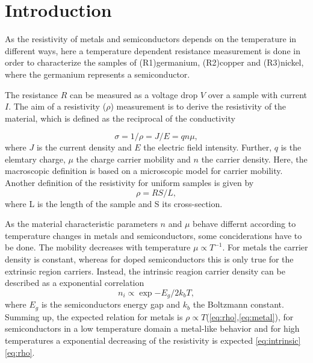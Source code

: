 



\section{Introduction}
\label{sec:Introduction}

As the resistivity of metals and semiconductors depends on the temperature in different ways,
here a temperature dependent resistance measurement is done in order to characterize the samples of 
(R1)germanium, (R2)copper and (R3)nickel, where the germanium represents a semiconductor.

The resistance $R$ can be measured as a voltage drop $V$ over a sample with current $I$.
The aim of a resistivity ($\rho$) measurement is to derive the resistivity of the material, which is defined as the reciprocal of the conductivity

\begin{equation}
    \sigma = 1 / \rho = J / E = q n \mu,
\end{equation}\label{eq:rho}
where $J$ is the current density and $E$ the electric field intensity.
Further, $q$ is the elemtary charge, $\mu$ the charge carrier mobility and $n$ the carrier density.
Here, the macroscopic definition is based on a microscopic model for carrier mobility.
Another definition of the resistivity for uniform samples is given by 
\begin{equation}
    \rho = R S / L,
\end{equation}
where L is the length of the sample and S its cross-section.

As the material characteristic parameters $n$ and $\mu$ behave differnt according to temperature changes in metals and semiconductors, some conciderations have to be done.
The mobility decreases with temperature $\mu \propto T^{-1}$\label{eq:metal}.
For metals the carrier density is constant, whereas for doped semiconductors this is only true for the extrinsic region carriers.
Instead, the intrinsic reagion carrier density can be described as a exponential correlation
\begin{equation}
  n_i \propto \exp{-E_g /2k_bT},
\end{equation}\label{eq:intrinsic}
where $E_g$ is the semiconductors energy gap and $k_b$ the Boltzmann constant.
Summing up, the expected relation for metals is $\rho \propto T$(\ref{eq:rho},\ref{eq:metal}), for semiconductors in a low temperature domain
a metal-like behavior and for high temperatures a exponential decreasing of the resistivity is expected \ref{eq:intrinsic}\ref{eq:rho}.

